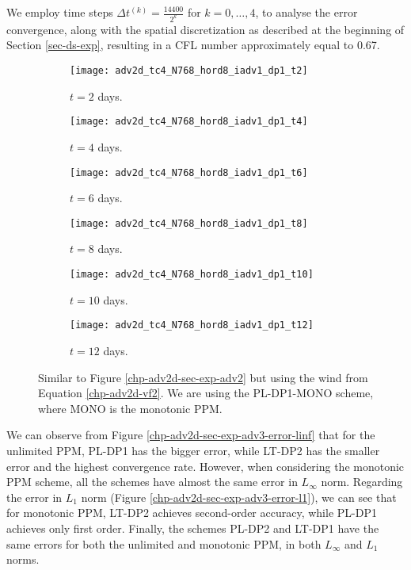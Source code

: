 We employ time steps $\Delta t^{(k)}=\frac{14400}{2^{k}}$ for 
$k = 0, \ldots, 4$, to analyse the error convergence, 
along with the spatial discretization as described at the beginning of Section \ref{sec-ds-exp},
resulting in a CFL number approximately equal to 0.67.
\begin{figure}[!htb]
	\centering
	\begin{subfigure}{0.25\textwidth}
		\centering
		\texttt{[image: adv2d\_tc4\_N768\_hord8\_iadv1\_dp1\_t2]}
		\caption{$t=2$ days.\label{chp-adv2d-sec-exp-adv3-a}}
	\end{subfigure}
	\begin{subfigure}{0.25\textwidth}
		\centering
		\texttt{[image: adv2d\_tc4\_N768\_hord8\_iadv1\_dp1\_t4]}
		\caption{$t=4$ days.\label{chp-adv2d-sec-exp-adv3-b}}
	\end{subfigure}
	\begin{subfigure}{0.25\textwidth}
		\centering
		\texttt{[image: adv2d\_tc4\_N768\_hord8\_iadv1\_dp1\_t6]}
		\caption{$t=6$ days.\label{chp-adv2d-sec-exp-adv3-c}}
	\end{subfigure}
	
	\begin{subfigure}{0.25\textwidth}
		\centering
		\texttt{[image: adv2d\_tc4\_N768\_hord8\_iadv1\_dp1\_t8]}
		\caption{$t=8$ days.\label{chp-adv2d-sec-exp-adv3-d}}
	\end{subfigure}
	\begin{subfigure}{0.25\textwidth}
		\centering
		\texttt{[image: adv2d\_tc4\_N768\_hord8\_iadv1\_dp1\_t10]}
		\caption{$t=10$ days.\label{chp-adv2d-sec-exp-adv3-e}}
	\end{subfigure}
	\begin{subfigure}{0.25\textwidth}
		\centering
		\texttt{[image: adv2d\_tc4\_N768\_hord8\_iadv1\_dp1\_t12]}
		\caption{$t=12$ days.\label{chp-adv2d-sec-exp-adv3-f}}
	\end{subfigure}
	\caption{Similar to Figure \ref{chp-adv2d-sec-exp-adv2}
		but using the wind from Equation \eqref{chp-adv2d-vf2}.
		We are using the PL-DP1-MONO scheme, where MONO is the monotonic PPM.\label{chp-adv2d-sec-exp-adv3}}
\end{figure}

We can observe from Figure \ref{chp-adv2d-sec-exp-adv3-error-linf} that for the unlimited PPM, PL-DP1 has the bigger error,
while LT-DP2 has the smaller error and the highest convergence rate.
However, when considering the monotonic PPM  scheme, all the schemes have almost the same error in $L_{\infty}$ norm.
Regarding the error in $L_{1}$ norm (Figure \ref{chp-adv2d-sec-exp-adv3-error-l1}), we can see that for monotonic PPM,
LT-DP2 achieves second-order accuracy, while PL-DP1 achieves only first order.
Finally, the schemes PL-DP2 and LT-DP1 have the same errors for both the unlimited and monotonic PPM, in both $L_{\infty}$ and $L_{1}$ norms.

